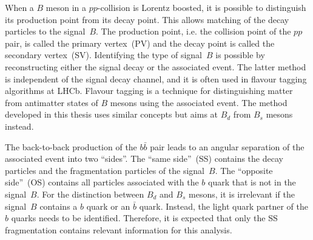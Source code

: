 When a $B$ meson in a $pp$-collision is Lorentz boosted, it is possible to distinguish its production point from its decay point.
This allows matching of the decay particles to the signal~$B$.
The production point, i.e. the collision point of the $pp$ pair, is called the primary vertex~(PV) and the decay point is called the secondary vertex~(SV).
Identifying the type of signal~$B$ is possible by reconstructing either the signal decay or the associated event. 
The latter method is independent of the signal decay channel, and it is often used in flavour tagging algorithms at LHCb. 
Flavour tagging is a technique for distinguishing matter from antimatter states of $B$ mesons using the associated event.
The method developed in this thesis uses similar concepts but aims at $B_d$ from $B_s$ mesons instead.

The back-to-back production of the $b\bar{b}$ pair leads to an angular separation of the associated event into two \enquote{sides}.
The \enquote{same side}~(SS) contains the decay particles and the fragmentation particles of the signal~$B$.
The \enquote{opposite side}~(OS) contains all particles associated with the $b$ quark that is not in the signal~$B$.
For the distinction between $B_d$ and $B_s$ mesons, it is irrelevant if the signal~$B$ contains a $b$ quark or an $\bar{b}$ quark.
Instead, the light quark partner of the $b$ quarks needs to be identified.
Therefore, it is expected that only the SS fragmentation contains relevant information for this analysis. 
